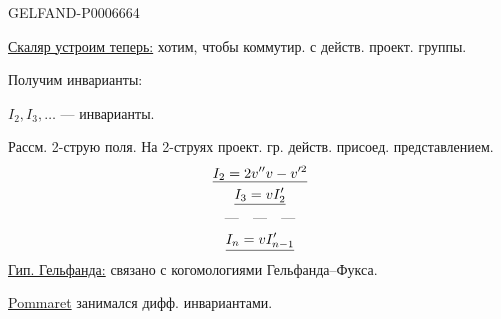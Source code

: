 \begin{GelfandAdjacentEvidence}{GELFAND-P000666}{4}


\underline{Скаляр устроим теперь:} хотим, чтобы коммутир. с действ. проект. группы.
\end{GelfandAdjacentEvidence}

Получим инварианты:

\(I_2,I_3,\ldots\) --- инварианты.

Рассм. 2-струю поля. На 2-струях проект. гр. действ. присоед. представлением.
\[
\begin{gathered}
\underline{I_2=2v''v-v'^2}\\
\underline{I_3=vI_2'}\\
\text{---\quad ---\quad ---}\\
\underline{I_n=vI_{n-1}'}
\end{gathered}
\]
\underline{Гип. Гельфанда:} связано с когомологиями Гельфанда–Фукса.

\underline{Pommaret} занимался дифф. инвариантами.


